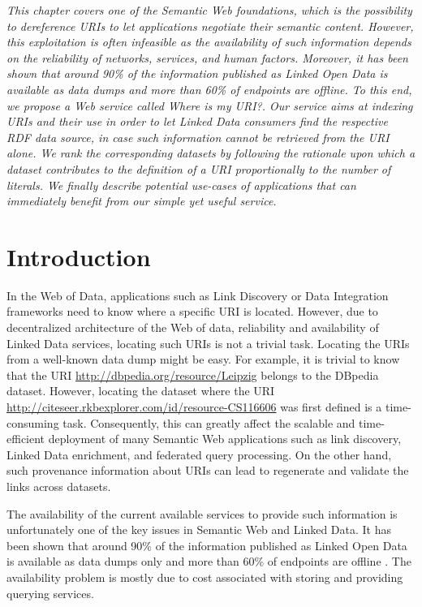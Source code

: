 \textit{This chapter covers one of the Semantic Web foundations, which is the possibility to dereference URIs to let applications negotiate their semantic content.
However, this exploitation is often infeasible as the availability of such information depends on the reliability of networks, services, and human factors.
Moreover, it has been shown that around 90\% of the information published as Linked Open Data is available as data dumps and more than 60\% of endpoints are offline.
To this end, we propose a Web service called \textit{Where is my URI?}.
Our service aims at indexing URIs and their use in order to let Linked Data consumers find the respective RDF data source, in case such information cannot be retrieved from the URI alone.
We rank the corresponding datasets by following the rationale upon which a dataset contributes to the definition of a URI proportionally to the number of literals.
We finally describe potential use-cases of applications that can immediately benefit from our simple yet useful service.}

\section{Introduction}
In the Web of Data, applications such as Link Discovery or Data Integration frameworks need to know where a specific URI is located.
However, due to decentralized architecture of the Web of data, reliability and availability of Linked Data services, locating such URIs is not a trivial task.
Locating the URIs from a well-known data dump might be easy. 
For example, it is trivial to know that the URI \url{http://dbpedia.org/resource/Leipzig} belongs to the DBpedia dataset. 
However, locating the dataset where the URI \url{http://citeseer.rkbexplorer.com/id/resource-CS116606} was first defined is a time-consuming task. 
Consequently, this can greatly affect the scalable and time-efficient deployment of many Semantic Web applications such as link discovery, Linked Data enrichment, and federated query processing.
On the other hand, such provenance information about URIs can lead to regenerate and validate the links across datasets.

The availability of the current available services to provide such information is unfortunately one of the key issues in Semantic Web and Linked Data.
It has been shown that around 90\% of the information published as Linked Open Data is available as data dumps only and more than 60\% of endpoints are offline \cite{vandenbussche2017sparqles}.
The availability problem is mostly due to cost associated with storing and providing querying services.%

